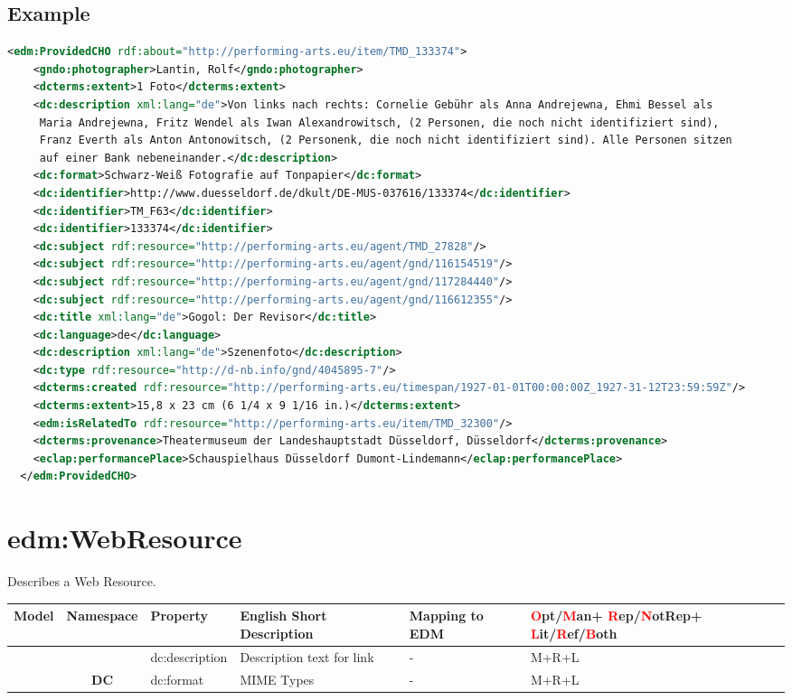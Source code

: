 \documentclass[12pt, a4paper, margin=2in]{report}
\begin{document}
\subsection*{Example}
\begin{lstlisting}[language=XML]
<edm:ProvidedCHO rdf:about="http://performing-arts.eu/item/TMD_133374">
    <gndo:photographer>Lantin, Rolf</gndo:photographer>
    <dcterms:extent>1 Foto</dcterms:extent>
    <dc:description xml:lang="de">Von links nach rechts: Cornelie Gebühr als Anna Andrejewna, Ehmi Bessel als
     Maria Andrejewna, Fritz Wendel als Iwan Alexandrowitsch, (2 Personen, die noch nicht identifiziert sind),
     Franz Everth als Anton Antonowitsch, (2 Personenk, die noch nicht identifiziert sind). Alle Personen sitzen
     auf einer Bank nebeneinander.</dc:description>
    <dc:format>Schwarz-Weiß Fotografie auf Tonpapier</dc:format>
    <dc:identifier>http://www.duesseldorf.de/dkult/DE-MUS-037616/133374</dc:identifier>
    <dc:identifier>TM_F63</dc:identifier>
    <dc:identifier>133374</dc:identifier>
    <dc:subject rdf:resource="http://performing-arts.eu/agent/TMD_27828"/>
    <dc:subject rdf:resource="http://performing-arts.eu/agent/gnd/116154519"/>
    <dc:subject rdf:resource="http://performing-arts.eu/agent/gnd/117284440"/>
    <dc:subject rdf:resource="http://performing-arts.eu/agent/gnd/116612355"/>
    <dc:title xml:lang="de">Gogol: Der Revisor</dc:title>
    <dc:language>de</dc:language>
    <dc:description xml:lang="de">Szenenfoto</dc:description>
    <dc:type rdf:resource="http://d-nb.info/gnd/4045895-7"/>
    <dcterms:created rdf:resource="http://performing-arts.eu/timespan/1927-01-01T00:00:00Z_1927-31-12T23:59:59Z"/>
    <dcterms:extent>15,8 x 23 cm (6 1/4 x 9 1/16 in.)</dcterms:extent>
    <edm:isRelatedTo rdf:resource="http://performing-arts.eu/item/TMD_32300"/>
    <dcterms:provenance>Theatermuseum der Landeshauptstadt Düsseldorf, Düsseldorf</dcterms:provenance>
    <eclap:performancePlace>Schauspielhaus Düsseldorf Dumont-Lindemann</eclap:performancePlace>
  </edm:ProvidedCHO>
\end{lstlisting}

\newpage
\section*{edm:WebResource \faExternalLink}
%
Describes a Web Resource.\\[0.5cm]
\begin{tabular}{|c|c|l|l|l|p{3cm}| } 
 \hline
 \textbf{Model} & \textbf{Namespace} & \textbf{Property} & \textbf{English Short Description} & \textbf{Mapping to EDM} & \textbf{\textcolor{red}{O}pt/\textcolor{red}{M}an+ \textcolor{red}{R}ep/\textcolor{red}{N}otRep+ \textcolor{red}{L}it/\textcolor{red}{R}ef/\textcolor{red}{B}oth} \\ 
 \hline
\rowcolor{dc}& & dc:description & Description text for link & - & M+R+L \\
\hhline{*{2}{|>{\arrayrulecolor{dc}}-}*{4}{|>{\arrayrulecolor{black}}-}}
\rowcolor{dc}\multirow{-2}{*}{\textbf{EDM}} & \multirow{-2}{*}{\textbf{DC}} & dc:format & MIME Types & - & M+R+L \\
 \hline
\end{tabular}
\end{document}
